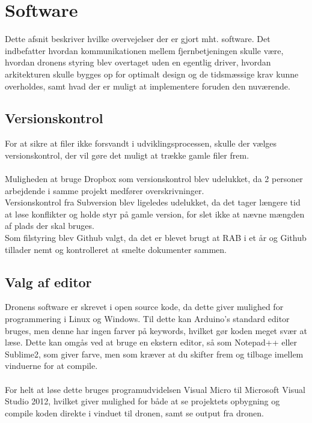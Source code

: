 \documentclass[Main]{subfiles}
\begin{document}
\chapter{Software}
Dette afsnit beskriver hvilke overvejelser der er gjort mht. software.
Det indbefatter hvordan kommunikationen mellem fjernbetjeningen skulle være, hvordan dronens styring blev overtaget uden en egentlig driver, hvordan arkitekturen skulle bygges op for optimalt design og de tidsmæssige krav kunne overholdes, samt hvad der er muligt at implementere foruden den nuværende.



\section{Versionskontrol}
For at sikre at filer ikke forsvandt i udviklingsprocessen, skulle der vælges  versionskontrol, der vil gøre det muligt at trække gamle filer frem.
\\
\\
Muligheden at bruge Dropbox som versionskontrol blev udelukket, da 2 personer arbejdende i samme projekt medfører overskrivninger.
\\
Versionskontrol fra Subversion blev ligeledes udelukket, da det tager længere tid at løse konflikter og holde styr på gamle version, for slet ikke at nævne mængden af plads der skal bruges.
\\
Som filstyring blev Github valgt, da det er blevet brugt at RAB i et år og Github tillader nemt og kontrolleret at smelte dokumenter sammen.





\section{Valg af editor}
Dronens software er skrevet i open source kode, da dette giver mulighed for programmering i Linux og Windows.
Til dette kan Arduino's standard editor bruges, men denne har ingen farver på keywords, hvilket gør koden meget svær at læse.
Dette kan omgås ved at bruge en ekstern editor, så som Notepad++ eller Sublime2, som giver farve, men som kræver at du skifter frem og tilbage imellem vinduerne for at compile.
\\
\\
For helt at løse dette bruges programudvidelsen Visual Micro til Microsoft Visual Studio 2012, hvilket giver mulighed for både at se projektets opbygning og compile koden direkte i vinduet til dronen, samt se output fra dronen.
\end{document}
